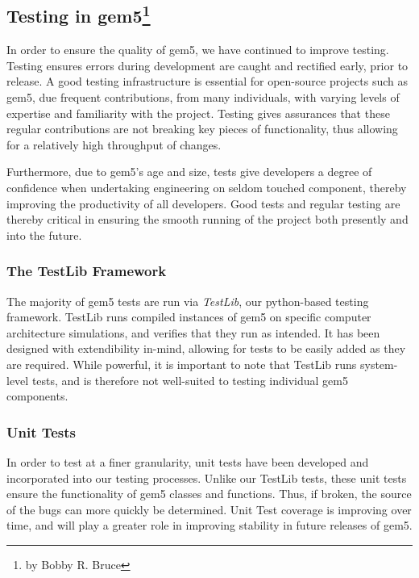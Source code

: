 \subsection[Testing in gem5]{Testing in gem5\footnote{by Bobby R. Bruce}}
\label{sec:testing}

In order to ensure the quality of gem5, we have continued to improve testing.
Testing ensures errors during development are caught and rectified early, prior
to release. A good testing infrastructure is essential for open-source projects
such as gem5, due frequent contributions, from many individuals, with varying
levels of expertise and familiarity with the project. Testing gives assurances
that these regular contributions are not breaking key pieces of functionality,
thus allowing for a relatively high throughput of changes.

Furthermore, due to gem5's age and size, tests give developers a degree of confidence when undertaking engineering on seldom touched component, thereby improving the productivity of all developers.
Good tests and regular testing are thereby critical in ensuring the smooth running of the project both presently and into the future.

\subsubsection{The TestLib Framework}

The majority of gem5 tests are run via \emph{TestLib}, our python-based
testing framework. TestLib runs compiled instances of gem5 on specific
computer architecture simulations, and verifies that they run as intended. It
has been designed with extendibility in-mind, allowing for tests to be easily
added as they are required. While powerful, it is important to note that
TestLib runs system-level tests, and is therefore not well-suited to testing
individual gem5 components.

\subsubsection{Unit Tests}

In order to test at a finer granularity, unit tests have been developed and
incorporated into our testing processes. Unlike our TestLib tests, these unit
tests ensure the functionality of gem5 classes and functions. Thus, if broken,
the source of the bugs can more quickly be determined. Unit Test coverage is
improving over time, and will play a greater role in improving stability in
future releases of gem5.

